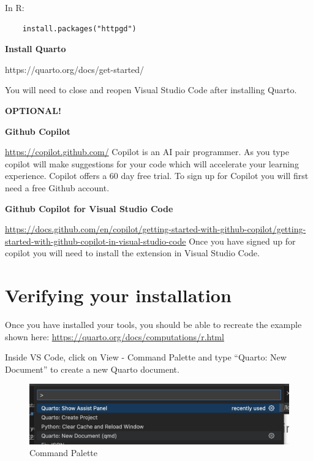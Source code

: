 \documentclass[
  letterpaper,
  DIV=11,
  numbers=noendperiod]{scrreprt}
\begin{document}
In R:

\begin{verbatim}
    install.packages("httpgd")
\end{verbatim}

\textbf{Install Quarto}

https://quarto.org/docs/get-started/

You will need to close and reopen Visual Studio Code after installing
Quarto.

\textbf{OPTIONAL!}

\textbf{Github Copilot}

\url{https://copilot.github.com/} Copilot is an AI pair programmer. As
you type copilot will make suggestions for your code which will
accelerate your learning experience. Copilot offers a 60 day free trial.
To sign up for Copilot you will first need a free Github account.

\textbf{Github Copilot for Visual Studio Code}

\url{https://docs.github.com/en/copilot/getting-started-with-github-copilot/getting-started-with-github-copilot-in-visual-studio-code}
Once you have signed up for copilot you will need to install the
extension in Visual Studio Code.


\hypertarget{verifying-your-installation}{%
\chapter{Verifying your
installation}\label{verifying-your-installation}}

Once you have installed your tools, you should be able to recreate the
example shown here: \url{https://quarto.org/docs/computations/r.html}

Inside VS Code, click on View - Command Palette and type ``Quarto: New
Document'' to create a new Quarto document.

\begin{figure}

{\centering \includegraphics{images/Screenshot 2023-02-23 at 11.11.03.png}

}

\caption{Command Palette}

\end{figure}
\end{document}
